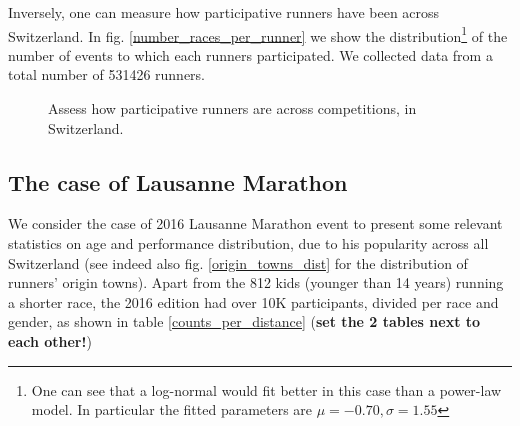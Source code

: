 \documentclass[fleqn,10pt]{wlscirep}
\begin{document}
		Inversely, one can measure how participative runners have been across Switzerland. 
		In fig. \ref{number_races_per_runner} we show the distribution\footnote{		One can see that a log-normal would fit better in this case than a power-law model. In particular the fitted parameters are $ \mu = -0.70, \sigma  = 1.55 $} of  the number of events to which each runners participated. We collected data from  a total number of 531426 runners.

		
		
		\begin{figure}[h]	
			\centering
			
			
			\caption{Assess how participative runners are across competitions, in Switzerland.}
		\end{figure}					
			
	\subsection*{The case of Lausanne Marathon}
		
		We consider the case of 2016 Lausanne Marathon event to present some relevant statistics on age and performance distribution, due to his popularity across all Switzerland (see indeed also fig. \ref{origin_towns_dist} for the distribution of runners' origin towns).
		Apart from the 812 kids (younger than 14 years) running  a shorter race, the 2016 edition had over 10K participants, divided per race  and gender, as shown in table \ref{counts_per_distance} (\textbf{set the 2 tables next to each other!})
\end{document}

